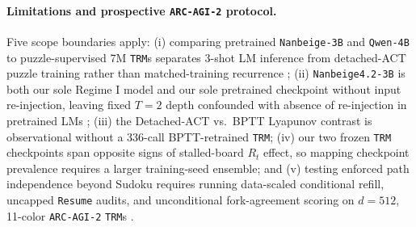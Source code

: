 \documentclass[10pt,letterpaper]{article}
\begin{document}
\paragraph{Limitations and prospective \texttt{ARC-AGI-2} protocol.} Five scope boundaries apply: (i) comparing pretrained \texttt{Nanbeige-3B} and \texttt{Qwen-4B} to puzzle-supervised 7M \texttt{TRM}s separates 3-shot LM inference from detached-ACT puzzle training rather than matched-training recurrence \cite{sesodia2026inside}; (ii) \texttt{Nanbeige4.2-3B} is both our sole Regime I model and our sole pretrained checkpoint without input re-injection, leaving fixed $T=2$ depth confounded with absence of re-injection in pretrained LMs \cite{olszowiec2026monitoring}; (iii) the Detached-ACT vs.\ BPTT Lyapunov contrast is observational without a 336-call BPTT-retrained \texttt{TRM}; (iv) our two frozen \texttt{TRM} checkpoints span opposite signs of stalled-board $R_t$ effect, so mapping checkpoint prevalence requires a larger training-seed ensemble; and (v) testing enforced path independence beyond Sudoku requires running data-scaled conditional refill, uncapped \texttt{Resume} audits, and unconditional fork-agreement scoring on $d=512$, 11-color \texttt{ARC-AGI-2} \texttt{TRM}s \cite{jolicoeur2025trm}.



\end{document}
